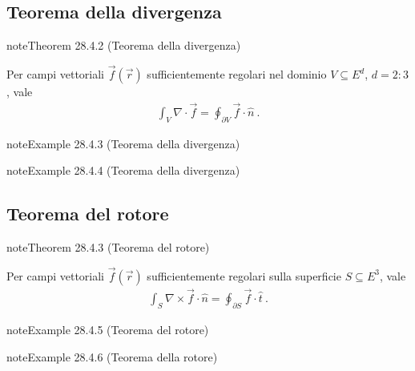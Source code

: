 \documentclass[letterpaper,10pt,italian]{jupyterBook}
\begin{document}
\subsection{Teorema della divergenza}
\label{\detokenize{ch/vector-calculus/stokes:teorema-della-divergenza}}\label{\detokenize{ch/vector-calculus/stokes:vector-calculus-stokes-divergence}}\label{ch/vector-calculus/stokes:theorem-3}
\begin{sphinxadmonition}{note}{Theorem 28.4.2 (Teorema della divergenza)}



\sphinxAtStartPar
Per campi vettoriali \(\vec{f}(\vec{r})\) sufficientemente regolari nel dominio \(V \subseteq E^d\), \(d=2:3\), vale
\begin{equation}\label{equation:ch/vector-calculus/stokes:eq:thm-divergence}
\begin{split}\int_{V} \nabla \cdot \vec{f} = \oint_{\partial V} \vec{f} \cdot \hat{n} \ .\end{split}
\end{equation}\end{sphinxadmonition}
\label{ch/vector-calculus/stokes:thm-divergence-1}
\begin{sphinxadmonition}{note}{Example 28.4.3 (Teorema della divergenza)}


\end{sphinxadmonition}
\label{ch/vector-calculus/stokes:thm-divergence-2}
\begin{sphinxadmonition}{note}{Example 28.4.4 (Teorema della divergenza)}


\end{sphinxadmonition}


\subsection{Teorema del rotore}
\label{\detokenize{ch/vector-calculus/stokes:teorema-del-rotore}}\label{\detokenize{ch/vector-calculus/stokes:vector-calculus-stokes-curl}}\label{ch/vector-calculus/stokes:theorem-6}
\begin{sphinxadmonition}{note}{Theorem 28.4.3 (Teorema del rotore)}



\sphinxAtStartPar
Per campi vettoriali \(\vec{f}(\vec{r})\) sufficientemente regolari sulla superficie \(S \subseteq E^3\), vale
\begin{equation}\label{equation:ch/vector-calculus/stokes:eq:thm-curl}
\begin{split}\int_{S} \nabla \times \vec{f} \cdot \hat{n} = \oint_{\partial S} \vec{f} \cdot \hat{t} \ .\end{split}
\end{equation}\end{sphinxadmonition}
\label{ch/vector-calculus/stokes:thm-curl-1}
\begin{sphinxadmonition}{note}{Example 28.4.5 (Teorema del rotore)}


\end{sphinxadmonition}
\label{ch/vector-calculus/stokes:thm-curl-2}
\begin{sphinxadmonition}{note}{Example 28.4.6 (Teorema della rotore)}


\end{sphinxadmonition}
\end{document}

